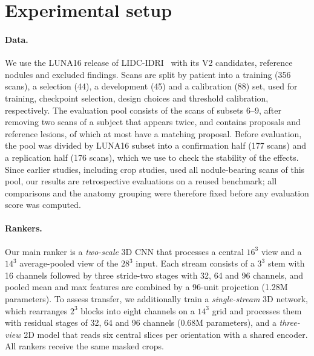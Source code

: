 \section{Experimental setup}
\label{sec:evaluation}

\paragraph{Data.} We use the LUNA16 release of LIDC-IDRI~\cite{setio2017luna16,armato2011lidc} with its V2 candidates, reference nodules and excluded findings. Scans are split by patient into a training (356 scans), a selection (44), a development (45) and a calibration (88) set, used for training, checkpoint selection, design choices and threshold calibration, respectively. The evaluation pool consists of the \EvalScans{} scans of subsets 6--9, after removing two scans of a subject that appears twice, and contains \EvalMarks{} proposals and \EvalLesions{} reference lesions, of which at most \ProposedLesions{} have a matching proposal. Before evaluation, the pool was divided by LUNA16 subset into a confirmation half (177 scans) and a replication half (176 scans), which we use to check the stability of the effects. Since earlier studies, including crop studies, used all nodule-bearing scans of this pool, our results are retrospective evaluations on a reused benchmark; all comparisons and the anatomy grouping were therefore fixed before any evaluation score was computed.

\paragraph{Rankers.} Our main ranker is a \emph{two-scale} 3D CNN that processes a central $16^3$ view and a $14^3$ average-pooled view of the $28^3$ input. Each stream consists of a $3^3$ stem with 16 channels followed by three stride-two stages with 32, 64 and 96 channels, and pooled mean and max features are combined by a 96-unit projection (1.28M parameters). To assess transfer, we additionally train a \emph{single-stream} 3D network, which rearranges $2^3$ blocks into eight channels on a $14^3$ grid and processes them with residual stages of 32, 64 and 96 channels (0.68M parameters), and a \emph{three-view} 2D model that reads six central slices per orientation with a shared encoder. All rankers receive the same masked crops.


